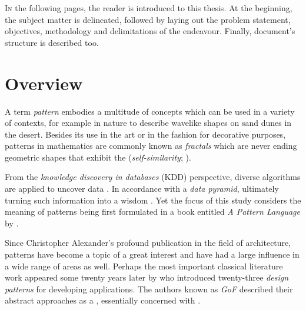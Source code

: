 \lettrine[lines=2]{\color{BrickRed}I}{n} the following pages, the reader is introduced to this thesis. 
At the beginning, the subject matter is delineated, followed by laying out the problem statement, objectives, methodology and delimitations of the endeavour.
Finally, document's structure is described too.

\section{Overview}
\label{motfac}
A term \emph{pattern} embodies a multitude of concepts which can be used in a variety of contexts, for example in nature to describe wavelike shapes on sand dunes in the desert.
Besides its use in the art or in the fashion for decorative purposes, patterns in mathematics are commonly known as \emph{fractals} which are never ending geometric shapes that exhibit the  (\emph{self-similarity}; \cite{Fractal2017}). 

From the \emph{knowledge discovery in databases} (\ac{KDD}) perspective, diverse algorithms are applied to uncover  data \parencites{PatternMining2013}{Witten2011}{GoebelMichGru1999}. 
In accordance with a \emph{data pyramid}, ultimately turning such information into a wisdom \parencite{Rowley2007TheHierarchy}.
Yet the focus of this study considers the meaning of patterns being first formulated in a book entitled \emph{A Pattern Language} by \textcite{Alexander1977}. 

Since Christopher Alexander's profound publication in the field of architecture, patterns have become a topic of a great interest and have had a large influence in a wide range of areas as well.
Perhaps the most important classical literature work appeared some twenty years later by \textcite[11]{GoF2002} who introduced twenty-three \emph{design patterns} for developing  applications.
The authors known as \emph{\ac{GoF}} described their abstract approaches as a , essentially concerned with  \parencites[37]{Schmidt:1996:SP:236156.236164}{Werner2006}. 

